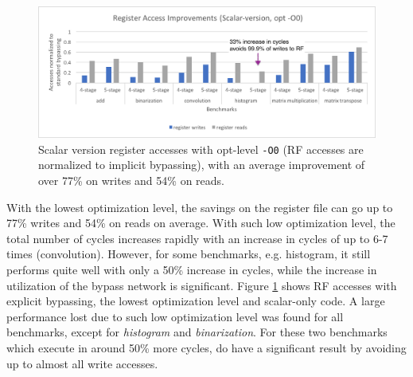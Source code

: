 \begin{figure}[H]
\centering
\hspace*{-.12in}
\includegraphics[width=\textwidth]{figures/scalar_version_improvements_O0}
\caption{Scalar version register accesses with opt-level \texttt{-O0} (RF accesses are normalized to implicit bypassing), with an average improvement of over 77\% on writes and 54\% on reads.}
\label{fig:scalar_improvements_O0}
\end{figure}

With the lowest optimization level, the savings on the register file can go up to 77\% writes and 54\% on reads on average. With such low optimization level, the total number of cycles increases rapidly with an increase in cycles of up to 6-7 times (convolution). However, for some benchmarks, e.g. histogram, it still performs quite well with only a 50\% increase in cycles, while the increase in utilization of the bypass network is significant. Figure \ref{fig:scalar_improvements_O0} shows RF accesses with explicit bypassing, the lowest optimization level and scalar-only code. A large performance lost due to such low optimization level was found for all benchmarks, except for \emph{histogram} and \emph{binarization}. For these two benchmarks which execute in around 50\% more cycles, do have a significant result by avoiding up to almost all write accesses.



